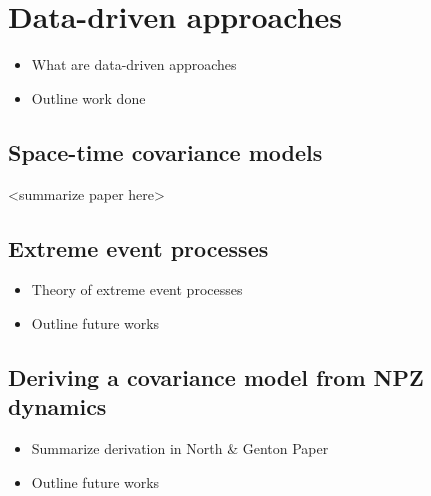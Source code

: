 

\chapter{Data-driven approaches}
\label{chapter2}

	\begin{itemize}
		\item What are data-driven approaches
		\item Outline work done
	\end{itemize}

	\section{Space-time covariance models}

		<summarize paper here>

	\section{Extreme event processes}

		\begin{itemize}
			\item Theory of extreme event processes
			\item Outline future works
		\end{itemize}

	\section{Deriving a covariance model from NPZ dynamics}

		\begin{itemize}
			\item Summarize derivation in North \& Genton Paper
			\item Outline future works
		\end{itemize}
